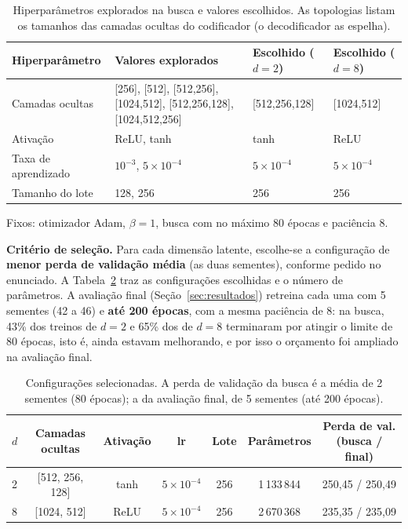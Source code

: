\documentclass[11pt,a4paper]{article}
\begin{document}
\begin{table}[ht]
\centering
\small
\caption{Hiperparâmetros explorados na busca e valores escolhidos. As topologias listam os tamanhos das camadas ocultas do codificador (o decodificador as espelha).}
\label{tab:hiper}
\begin{tabularx}{\textwidth}{lXll}
\toprule
\textbf{Hiperparâmetro} & \textbf{Valores explorados} & \textbf{Escolhido ($d=2$)} & \textbf{Escolhido ($d=8$)} \\
\midrule
Camadas ocultas & [256], [512], [512,256], [1024,512], [512,256,128], [1024,512,256] & [512,256,128] & [1024,512] \\
Ativação & ReLU, tanh & tanh & ReLU \\
Taxa de aprendizado & $10^{-3}$, $5\times10^{-4}$ & $5\times10^{-4}$ & $5\times10^{-4}$ \\
Tamanho do lote & 128, 256 & 256 & 256 \\
\bottomrule
\end{tabularx}
\smallskip

\footnotesize Fixos: otimizador Adam, $\beta=1$, busca com no máximo 80 épocas e paciência 8.
\end{table}

\textbf{Critério de seleção.} Para cada dimensão latente, escolhe-se a configuração de \textbf{menor perda de validação média} (as duas sementes), conforme pedido no enunciado. A Tabela~\ref{tab:config} traz as configurações escolhidas e o número de parâmetros. A avaliação final (Seção~\ref{sec:resultados}) retreina cada uma com 5 sementes (42 a 46) e \textbf{até 200 épocas}, com a mesma paciência de 8: na busca, 43\% dos treinos de $d=2$ e 65\% dos de $d=8$ terminaram por atingir o limite de 80 épocas, isto é, ainda estavam melhorando, e por isso o orçamento foi ampliado na avaliação final.

\begin{table}[ht]
\centering
\small
\caption{Configurações selecionadas. A perda de validação da busca é a média de 2 sementes (80 épocas); a da avaliação final, de 5 sementes (até 200 épocas).}
\label{tab:config}
\begin{tabular}{lcccccc}
\toprule
$d$ & \textbf{Camadas ocultas} & \textbf{Ativação} & \textbf{lr} & \textbf{Lote} & \textbf{Parâmetros} & \textbf{Perda de val. (busca / final)} \\
\midrule
2 & [512, 256, 128] & tanh & $5\times10^{-4}$ & 256 & 1\,133\,844 & 250,45 / 250,49 \\
8 & [1024, 512] & ReLU & $5\times10^{-4}$ & 256 & 2\,670\,368 & 235,35 / 235,09 \\
\bottomrule
\end{tabular}
\end{table}
\end{document}
